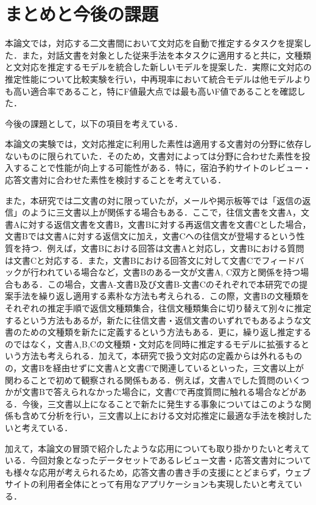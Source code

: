 \documentclass[japanese]{jnlp_1.4}
\begin{document}
\section{まとめと今後の課題}

本論文では，対応する二文書間において文対応を自動で推定するタスクを提案した．また，対話文書を対象とした従来手法を本タスクに適用すると共に，文種類と文対応を推定するモデルを統合した新しいモデルを提案した．実際に文対応の推定性能について比較実験を行い，中再現率において統合モデルは他モデルよりも高い適合率であること，特にF値最大点では最も高いF値であることを確認した．

今後の課題として，以下の項目を考えている．

本論文の実験では，文対応推定に利用した素性は適用する文書対の分野に依存しないものに限られていた．そのため，文書対によっては分野に合わせた素性を投入することで性能が向上する可能性がある．特に，宿泊予約サイトのレビュー・応答文書対に合わせた素性を検討することを考えている．

また，本研究では二文書の対に限っていたが，メールや掲示板等では「返信の返信」のように三文書以上が関係する場合もある．ここで，往信文書を文書A，文書Aに対する返信文書を文書B，文書Bに対する再返信文書を文書Cとした場合，文書Bでは文書Aに対する返信文に加え，文書Cへの往信文が登場するという性質を持つ．例えば，文書Bにおける回答は文書Aと対応し，文書Bにおける質問は文書Cと対応する．また，文書Bにおける回答文に対して文書Cでフィードバックが行われている場合など，文書Bのある一文が文書A, C双方と関係を持つ場合もある．この場合，文書A-文書B及び文書B-文書Cのそれぞれで本研究での提案手法を繰り返し適用する素朴な方法も考えられる．この際，文書Bの文種類をそれぞれの推定手順で返信文種類集合，往信文種類集合に切り替えて別々に推定するという方法もあるが，新たに往信文書・返信文書のいずれでもあるような文書のための文種類を新たに定義するという方法もある．更に，繰り返し推定するのではなく，文書A,B,Cの文種類・文対応を同時に推定するモデルに拡張するという方法も考えられる．加えて，本研究で扱う文対応の定義からは外れるものの，文書Bを経由せずに文書Aと文書Cで関連しているといった，三文書以上が関わることで初めて観察される関係もある．例えば，文書Aでした質問のいくつかが文書Bで答えられなかった場合に，文書Cで再度質問に触れる場合などがある．今後，三文書以上になることで新たに発生する事象についてはこのような関係も含めて分析を行い，三文書以上における文対応推定に最適な手法を検討したいと考えている．

加えて，本論文の冒頭で紹介したような応用についても取り掛かりたいと考えている．今回対象となったデータセットであるレビュー文書・応答文書対についても様々な応用が考えられるため，応答文書の書き手の支援にとどまらず，ウェブサイトの利用者全体にとって有用なアプリケーションも実現したいと考えている．
\end{document}
